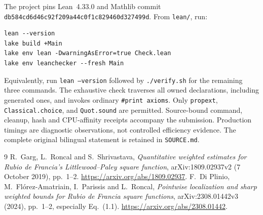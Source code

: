 \documentclass[10pt,a4paper]{article}
\begin{document}
The project pins Lean~4.33.0 and Mathlib commit
\texttt{db584cd6d46c92f209a44c0f1c829460d327499d}.
From \texttt{lean/}, run:
\begin{verbatim}
lean --version
lake build +Main
lake env lean -DwarningAsError=true Check.lean
lake env leanchecker --fresh Main
\end{verbatim}
Equivalently, run \texttt{lean --version} followed by \texttt{./verify.sh} for the remaining three commands. The exhaustive check traverses all owned declarations, including generated ones, and invokes ordinary \texttt{\#print axioms}. Only \texttt{propext}, \texttt{Classical.choice}, and \texttt{Quot.sound} are permitted. Source-bound command, cleanup, hash and CPU-affinity receipts accompany the submission. Production timings are diagnostic observations, not controlled efficiency evidence. The complete original bilingual statement is retained in \texttt{SOURCE.md}.

\begin{thebibliography}{9}
 R.~Garg, L.~Roncal and S.~Shrivastava,
\emph{Quantitative weighted estimates for Rubio de Francia's Littlewood--Paley square function},
arXiv:1809.02937v2 (7 October 2019), pp.~1--2.
\url{https://arxiv.org/abs/1809.02937}.
 F.~Di Plinio, M.~Fl\'orez-Amatriain, I.~Parissis and L.~Roncal,
\emph{Pointwise localization and sharp weighted bounds for Rubio de Francia square functions},
arXiv:2308.01442v3 (2024), pp.~1--2, especially Eq.~(1.1).
\url{https://arxiv.org/abs/2308.01442}.
\end{thebibliography}
\end{document}
